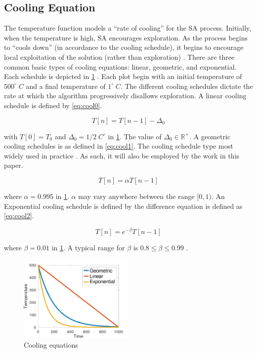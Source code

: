 \documentclass[11pt,a4paper,final]{article}
\newcommand{\Tau}{T}                        %
\begin{document}
\subsection{Cooling Equation}
\label{cooling-equation-experimental}
The temperature function models a ``rate of cooling'' for the SA process. Initially, when the temperature is high, SA
encourages exploration. As the process begins to ``cools down'' (in accordance to the cooling schedule), it begins to
encourage local exploitation of the solution (rather than exploration)
\cite{rutenbar-1989-simul-anneal-algor,henderson-1989-theor-pract}. There are three common basic types of cooling
equations: linear, geometric, and exponential. Each schedule is depicted in \ref{fig:cool} \cite{keller-2019-multi-objec}.
Each plot begin with an initial temperature of \(500^\circ\; C\) and a final temperature of \(1^\circ\; C\). The different cooling
schedules dictate the rate at which the algorithm progressively disallows exploration. A linear cooling schedule is
defined by \ref{eq:cool0}.

\begin{equation}
\label{eq:cool0}
\Tau[n] = \Tau[n-1] - \Delta_0
\end{equation}

with \(\Tau[0] = \Tau_0\) and \(\Delta_0 = 1/2\; C^\circ\) in \ref{fig:cool}. The value of \(\Delta_0 \in \mathbb{R}^+\). A geometric cooling schedules is as
defined in \ref{eq:cool1}. The cooling schedule type most widely used in practice \cite{keller-2019-multi-objec}. As such, it
will also be employed by the work in this paper.

\begin{equation}
\label{eq:cool1}
\Tau[n] = \alpha \Tau[n-1]
\end{equation}

where \(\alpha = 0.995\) in \ref{fig:cool}. \(\alpha\) may vary anywhere between the range \([0,1)\). An Exponential cooling schedule is
defined by the difference equation is defined as \ref{eq:cool2}.

\begin{equation}
\label{eq:cool2}
\Tau[n] = e^{-\beta}\Tau[n-1]
\end{equation}

where \(\beta = 0.01\) in \ref{fig:cool}. A typical range for \(\beta\) is \(0.8 \le \beta \le 0.99\) \cite{delahaye-2019-simul}.

\begin{figure}[htbp]
\centering
\includegraphics[width=0.5\textwidth]{sections/img/cool_func.png}
\caption{\label{fig:cool}Cooling equations}
\end{figure}
\end{document}
